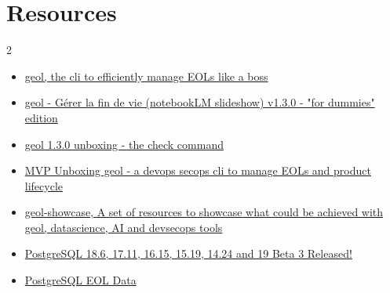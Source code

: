 \documentclass[11pt, a4paper]{article}
\begin{document}
\section{Resources}

\begin{multicols}{2}
\begin{itemize}
    \item \href{https://dev.to/adriens/geol-the-cli-to-efficiently-manage-eols-like-a-boss-3hne}{geol, the cli to efficiently manage EOLs like a boss}
    \item \href{https://youtu.be/ZqiXogK2fSw}{geol - Gérer la fin de vie (notebookLM slideshow) v1.3.0 - "for dummies" edition}
    \item \href{https://youtu.be/yCZRgAiQt9s}{geol 1.3.0 unboxing - the check command}
    \item \href{https://youtu.be/vhFXWGqB_-g}{MVP Unboxing geol - a devops secops cli to manage EOLs and product lifecycle}
    \item \href{https://github.com/adriens/geol-showcase}{geol-showcase, A set of resources to showcase what could be achieved with geol, datascience, AI and devsecops tools}
    \item \href{https://www.postgresql.org/about/news/postgresql-186-1711-1615-1519-1424-and-19-beta-3-released-3365/}{PostgreSQL 18.6, 17.11, 16.15, 15.19, 14.24 and 19 Beta 3 Released!}
    \item \href{https://endoflife.date/postgresql}{PostgreSQL EOL Data}
\end{itemize}
\end{multicols}
\end{document}
